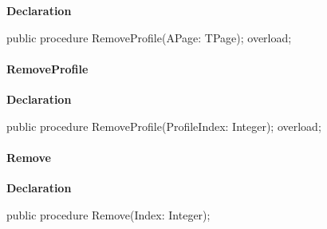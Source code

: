 \documentclass{report}
\newif\ifpdf
\begin{document}
\label{editor.TFileProfiles-RemoveProfile}
\begin{list}{}{
\setlength{\itemindent}{0cm}
\setlength{\listparindent}{0cm}
\setlength{\leftmargin}{\evensidemargin}
\addtolength{\leftmargin}{\tmplength}
\settowidth{\labelsep}{X}
\addtolength{\leftmargin}{\labelsep}
\setlength{\labelwidth}{\tmplength}
}
\item[\textbf{Declaration}\hfill]
\ifpdf
\begin{flushleft}
\fi
\begin{ttfamily}
public procedure RemoveProfile(APage: TPage); overload;\end{ttfamily}

\ifpdf
\end{flushleft}
\fi

\end{list}
\paragraph*{RemoveProfile}\hspace*{\fill}

\label{editor.TFileProfiles-RemoveProfile}
\begin{list}{}{
\setlength{\itemindent}{0cm}
\setlength{\listparindent}{0cm}
\setlength{\leftmargin}{\evensidemargin}
\addtolength{\leftmargin}{\tmplength}
\settowidth{\labelsep}{X}
\addtolength{\leftmargin}{\labelsep}
\setlength{\labelwidth}{\tmplength}
}
\item[\textbf{Declaration}\hfill]
\ifpdf
\begin{flushleft}
\fi
\begin{ttfamily}
public procedure RemoveProfile(ProfileIndex: Integer); overload;\end{ttfamily}

\ifpdf
\end{flushleft}
\fi

\end{list}
\paragraph*{Remove}\hspace*{\fill}

\label{editor.TFileProfiles-Remove}
\begin{list}{}{
\setlength{\itemindent}{0cm}
\setlength{\listparindent}{0cm}
\setlength{\leftmargin}{\evensidemargin}
\addtolength{\leftmargin}{\tmplength}
\settowidth{\labelsep}{X}
\addtolength{\leftmargin}{\labelsep}
\setlength{\labelwidth}{\tmplength}
}
\item[\textbf{Declaration}\hfill]
\ifpdf
\begin{flushleft}
\fi
\begin{ttfamily}
public procedure Remove(Index: Integer);\end{ttfamily}

\ifpdf
\end{flushleft}
\fi

\end{list}
\end{document}
